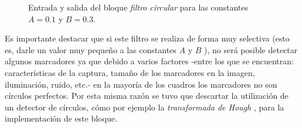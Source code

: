 \begin{figure}[H]
  \caption{Entrada y salida del bloque \emph{filtro circular} para las constantes $A = 0.1$ y $B = 0.3$.}
      \label{ejemplofiltrocirc}
\end{figure}

Es importante destacar que si este filtro se realiza de forma muy selectiva (esto es, darle un valor muy pequeño a las constantes $A$ y $B$ ), no será posible detectar algunos marcadores ya que debido a varios factores -entre los que se encuentran: características de la captura, tamaño de los marcadores en la imagen, iluminación, ruido, etc.- en la mayoría de los cuadros los marcadores no son círculos perfectos. Por esta misma razón se tuvo que descartar la utilización de un detector de círculos, cómo por ejemplo la \textit{transformada de Hough} \cite{hough}, para la implementación de este bloque. 

